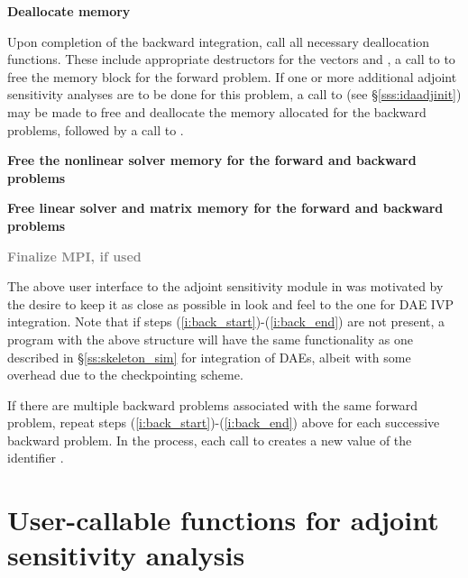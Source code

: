 \begin{Steps}
\item
  {\bf Deallocate memory}

  Upon completion of the backward integration, call all necessary deallocation
  functions. These include appropriate destructors for the vectors  and
  , a call to  to free the {\idas} memory block for the
  forward problem.  If one or more additional adjoint sensitivity analyses are to
  be done for this problem, a call to  (see \S\ref{sss:idaadjinit})
  may be made to free and deallocate the memory allocated for the backward problems,
  followed by a call to .

\item
  {\bf Free the nonlinear solver memory for the forward and backward problems}

\item
  {\bf Free linear solver and matrix memory for the forward and backward problems}

\item
  \textcolor{gray}{\bf Finalize MPI, if used}

\end{Steps}

The above user interface to the adjoint sensitivity module in {\idas} was motivated by
the desire to keep it as close as possible in look and feel to the one for DAE IVP
integration. Note that if steps (\ref{i:back_start})-(\ref{i:back_end}) are not present,
a program with the above structure will have the same functionality as one described in
\S\ref{ss:skeleton_sim} for integration of DAEs, albeit with some overhead due to
the checkpointing scheme.

If there are multiple backward problems associated with the same forward problem,
repeat steps (\ref{i:back_start})-(\ref{i:back_end}) above for each successive
backward problem.  In the process, each call to  creates a new
value of the identifier .

\section{User-callable functions for adjoint sensitivity analysis}

